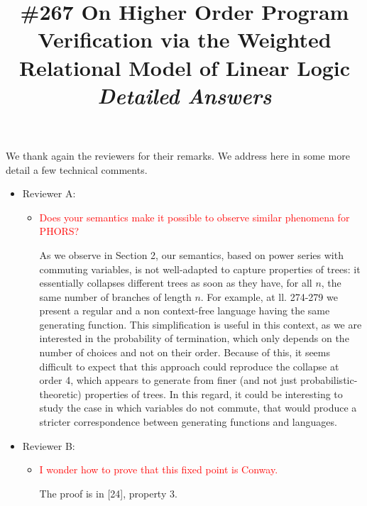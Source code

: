 \documentclass[a4paper,10pt]{article}
\newcommand{\red}[1]{\textcolor{red}{#1}}
\begin{document}
\title{\#267 On Higher Order Program Verification via the Weighted Relational Model of Linear Logic\\ \emph{Detailed Answers}}
\date{}
\maketitle


We thank again the reviewers for their remarks. We address here in some more detail a few technical comments.

\begin{itemize}
	\item Reviewer A:
	\begin{itemize}
		\item \red{Does your semantics make it possible to observe similar phenomena for PHORS? }
		
		
		As we observe in Section 2, our semantics, based on power series with commuting variables, is not well-adapted to capture properties of trees: it essentially collapses different trees as soon as they have, for all $n$, the same number of branches of length $n$. For example, at ll. 274-279 we present a regular and a non context-free language having the same generating function. This simplification is useful in this context, as we are interested in the probability of termination, which only depends on the number of choices and not on their order. 
		Because of this, it seems difficult to expect that this approach could reproduce the collapse at order 4, which appears to generate from finer (and not just probabilistic-theoretic) properties of trees. In this regard, it could be interesting to study the case in which variables do not commute, that would produce a stricter correspondence between generating functions and languages.
	\end{itemize}

\item Reviewer B:
	\begin{itemize}
	
	\item \red{I wonder how to prove that this fixed point is Conway.}
	
The proof is in [24], property 3.
	

\end{itemize}
\end{itemize}
\end{document}
